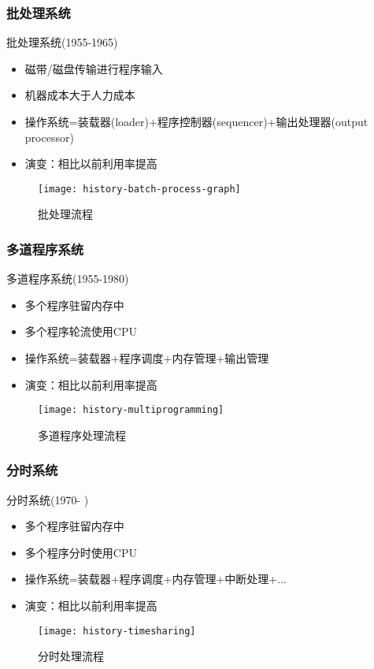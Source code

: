 \begin{frame}
	
	\frametitle{批处理系统}
	
	批处理系统(1955-1965)
	\begin{itemize}
		\item 磁带/磁盘传输进行程序输入
		\item 机器成本大于人力成本	
		\item 操作系统=装载器(loader)+程序控制器(sequencer)+输出处理器(output processor)
		\item 演变：相比以前利用率提高
	\end{itemize}
	
	\begin{figure}
		\centering
		\texttt{[image: history-batch-process-graph]}
		\caption{批处理流程}
	\end{figure}
	
\end{frame}




\begin{frame}[plain]
	
	\frametitle{多道程序系统}
	
	多道程序系统(1955-1980)
	\begin{itemize}
		\item 多个程序驻留内存中
		\item 多个程序轮流使用CPU	
		\item 操作系统=装载器+程序调度+内存管理+输出管理
		\item 演变：相比以前利用率提高
	\end{itemize}
	
	\begin{figure}
		\centering
		\texttt{[image: history-multiprogramming]}
		\caption{多道程序处理流程}
	\end{figure}
	
\end{frame}


\begin{frame}[plain]
	
	\frametitle{分时系统}
	
	分时系统(1970- )
	\begin{itemize}
		\item 多个程序驻留内存中
		\item 多个程序分时使用CPU	
		\item 操作系统=装载器+程序调度+内存管理+中断处理+...
		\item 演变：相比以前利用率提高
	\end{itemize}
	
	\begin{figure}
		\centering
		\texttt{[image: history-timesharing]}
		\caption{分时处理流程}
	\end{figure}
	
\end{frame}



